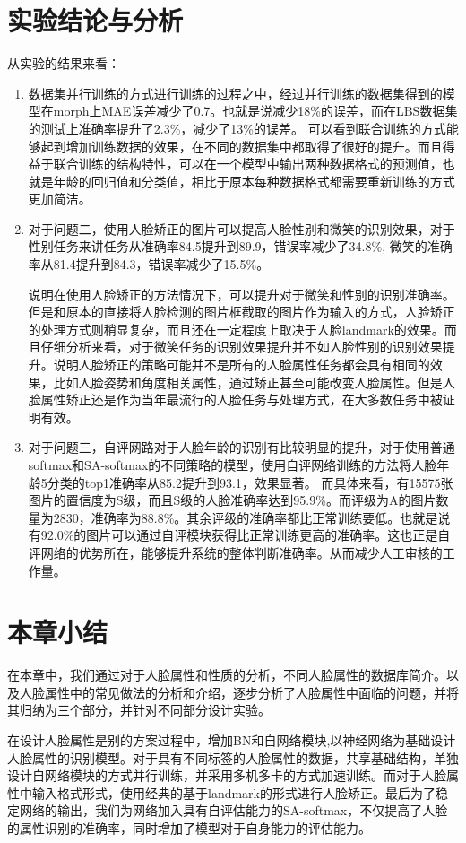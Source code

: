 \section{实验结论与分析}
从实验的结果来看：
\begin{enumerate}
\item 数据集并行训练的方式进行训练的过程之中，经过并行训练的数据集得到的模型在morph上MAE误差减少了0.7。也就是说减少18\%的误差，而在LBS数据集的测试上准确率提升了2.3\%，减少了13\%的误差。
可以看到联合训练的方式能够起到增加训练数据的效果，在不同的数据集中都取得了很好的提升。而且得益于联合训练的结构特性，可以在一个模型中输出两种数据格式的预测值，也就是年龄的回归值和分类值，相比于原本每种数据格式都需要重新训练的方式更加简洁。
\item 对于问题二，使用人脸矫正的图片可以提高人脸性别和微笑的识别效果，对于性别任务来讲任务从准确率84.5提升到89.9，错误率减少了34.8\%,
微笑的准确率从81.4提升到84.3，错误率减少了15.5\%。

说明在使用人脸矫正的方法情况下，可以提升对于微笑和性别的识别准确率。但是和原本的直接将人脸检测的图片框截取的图片作为输入的方式，人脸矫正的处理方式则稍显复杂，而且还在一定程度上取决于人脸landmark的效果。而且仔细分析来看，对于微笑任务的识别效果提升并不如人脸性别的识别效果提升。说明人脸矫正的策略可能并不是所有的人脸属性任务都会具有相同的效果，比如人脸姿势和角度相关属性，通过矫正甚至可能改变人脸属性。但是人脸属性矫正还是作为当年最流行的人脸任务与处理方式，在大多数任务中被证明有效。
\item 
对于问题三，自评网路对于人脸年龄的识别有比较明显的提升，对于使用普通softmax和SA-softmax的不同策略的模型，使用自评网络训练的方法将人脸年龄5分类的top1准确率从85.2提升到93.1，效果显著。
而具体来看，有15575张图片的置信度为S级，而且S级的人脸准确率达到95.9\%。而评级为A的图片数量为2830，准确率为88.8\%。其余评级的准确率都比正常训练要低。也就是说有92.0\%的图片可以通过自评模块获得比正常训练更高的准确率。这也正是自评网络的优势所在，能够提升系统的整体判断准确率。从而减少人工审核的工作量。
\end{enumerate}

\section{本章小结}
在本章中，我们通过对于人脸属性和性质的分析，不同人脸属性的数据库简介。以及人脸属性中的常见做法的分析和介绍，逐步分析了人脸属性中面临的问题，并将其归纳为三个部分，并针对不同部分设计实验。

在设计人脸属性是别的方案过程中，增加BN和自网络模块,以神经网络为基础设计人脸属性的识别模型。对于具有不同标签的人脸属性的数据，共享基础结构，单独设计自网络模块的方式并行训练，并采用多机多卡的方式加速训练。而对于人脸属性中输入格式形式，使用经典的基于landmark的形式进行人脸矫正。最后为了稳定网络的输出，我们为网络加入具有自评估能力的SA-softmax，不仅提高了人脸的属性识别的准确率，同时增加了模型对于自身能力的评估能力。









 
 
 
